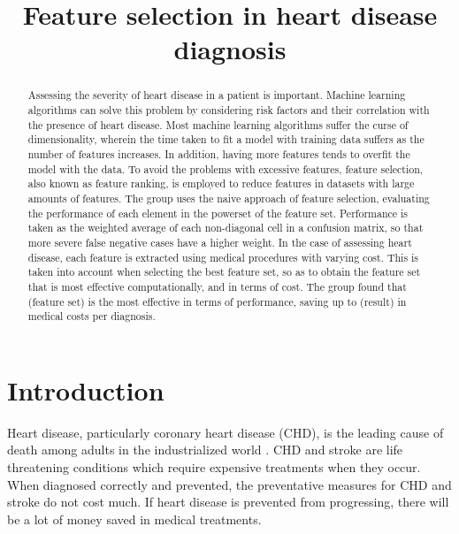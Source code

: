 \documentclass[conference]{IEEEtran}
\begin{document}
\title{Feature selection in heart disease diagnosis}

\author{
}

\maketitle

\begin{abstract}
	Assessing the severity of heart disease in a patient is important.
	Machine learning algorithms can solve this problem by considering risk factors and their correlation with the presence of heart disease.
	Most machine learning algorithms suffer the curse of dimensionality, wherein the time taken to fit a model with training data suffers as the number of features increases.
	In addition, having more features tends to overfit the model with the data.
	To avoid the problems with excessive features, feature selection, also known as feature ranking, is employed to reduce features in datasets with large amounts of features.
	The group uses the naive approach of feature selection, evaluating the performance of each element in the powerset of the feature set.
	Performance is taken as the weighted average of each non-diagonal cell in a confusion matrix, so that more severe false negative cases have a higher weight.
	In the case of assessing heart disease, each feature is extracted using medical procedures with varying cost.
	This is taken into account when selecting the best feature set, so as to obtain the feature set that is most effective computationally, and in terms of cost.
	The group found that (feature set) is the most effective in terms of performance, saving up to (result) in medical costs per diagnosis.
\end{abstract}

\section{Introduction}
	Heart disease, particularly coronary heart disease (CHD), is the leading cause of death among adults in the industrialized world \cite{bib:stroke_stat}.
	CHD and stroke are life threatening conditions which require expensive treatments when they occur.
	When diagnosed correctly and prevented, the preventative measures for CHD and stroke do not cost much.
	If heart disease is prevented from progressing, there will be a lot of money saved in medical treatments.
\end{document}
